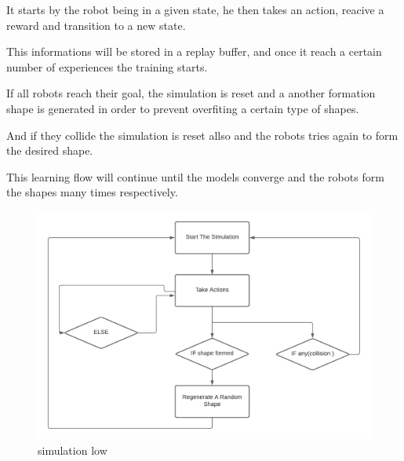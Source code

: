 \documentclass[12pt]{extarticle}
\begin{document}
It starts by the robot being in a given state, he then takes an action, reacive a reward and transition to a new state.

This informations will be stored in a replay buffer, and once it reach a certain number of experiences the training starts.



If all robots reach their goal, the simulation is reset and a another formation shape is generated in order to prevent overfiting a certain type of shapes.

And if they collide the simulation is reset allso and the robots tries again to form the desired shape.

This learning flow will continue until the models converge and the robots form the shapes many times respectively.
 \begin{figure}[h]  
\centering
\includegraphics[scale=0.8]{simulation_flow}
\caption[simulation flow]{simulation low}
\end{figure}
\end{document}
